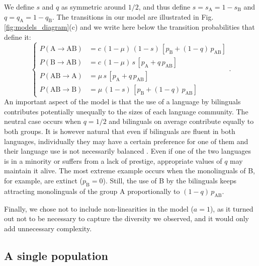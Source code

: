 \documentclass[../thesis.tex]{subfiles}
\begin{document}
We define $s$ and $q$ as symmetric around $1/2$, and thus define $s = s_\text{A} = 1 -
s_\text{B}$ and $q = q_\text{A} = 1 - q_\text{B}$. The transitions in our model are
illustrated in Fig. \cref{fig:models_diagram}(c) and we write here below the
transition probabilities that define it:
\begin{equation}
\label{eq:bipref_model}
\left\{
\begin{aligned}
    P (\text{A} \rightarrow \text{AB}) &= c \, (1 - \mu) \, (1-s) \, \left[ p_{\text{B}} + (1-q) \,  p_{\text{AB}} \right] \\
    P (\text{B} \rightarrow \text{AB}) &= c \, (1 - \mu) \, s \, \left[ p_{\text{A}} + q \, p_{\text{AB}} \right] \\
    P (\text{AB} \rightarrow \text{A}) &= \mu \, s \, \left[ p_{\text{A}} + q \, p_{\text{AB}} \right] \\
    P (\text{AB} \rightarrow \text{B}) &= \mu \, (1-s) \, \left[ p_{\text{B}} + (1-q) \, p_{\text{AB}} \right]
\end{aligned}
\right. .
\end{equation}
An important aspect of the model is that the use of a language by bilinguals contributes
potentially unequally to the sizes of each language community. The neutral case occurs
when $q = 1/2$ and bilinguals on average contribute equally to both groups. It is
however natural that even if bilinguals are fluent in both languages, individually they
may have a certain preference for one of them and their language use is not necessarily
balanced \cite{RomaineBilingualMultilingual2012}. Even if one of the two languages is in
a minority or suffers from a lack of prestige, appropriate values of $q$ may maintain it
alive. The most extreme example occurs when the monolinguals of B, for example, are
extinct ($p_{\text{B}} = 0$). Still, the use of B by the bilinguals keeps attracting
monolinguals of the group A proportionally to $(1-q)\, p_{\text{AB}}$.

Finally, we chose not to include non-linearities in the model ($a = 1$), as it turned out
not to be necessary to capture the diversity we observed, and it would only add
unnecessary complexity.


\subsection{A single population}
\end{document}
